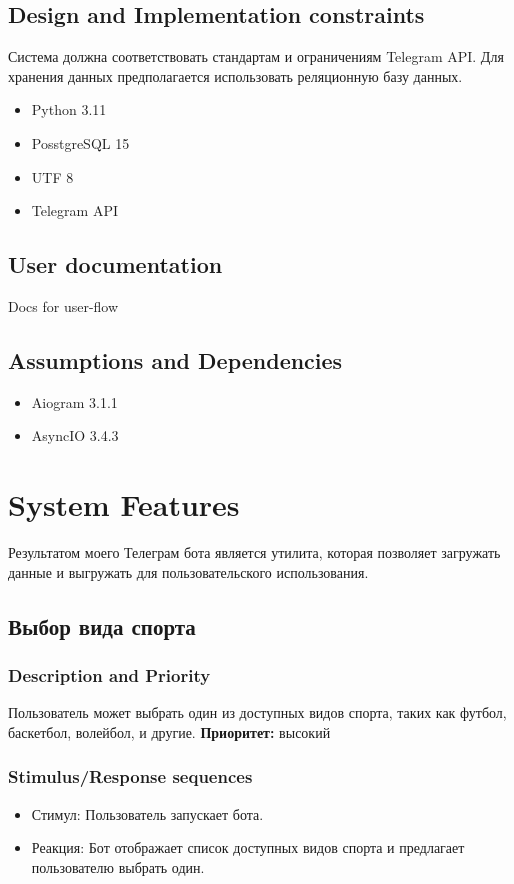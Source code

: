 \documentclass{scrreprt}
\begin{document}
\section{Design and Implementation constraints}
Система должна соответствовать стандартам и ограничениям Telegram API. Для хранения данных предполагается использовать реляционную базу данных.
\begin{itemize}
    \item Python 3.11
    \item PosstgreSQL 15
    \item UTF 8
    \item Telegram API
\end{itemize}


\section{User documentation}
Docs for user-flow

\section{Assumptions and Dependencies}
\begin{itemize}
    \item Aiogram 3.1.1
    \item AsyncIO 3.4.3
\end{itemize}

\chapter{System Features}
Результатом моего Телеграм бота является утилита, которая позволяет загружать данные и выгружать для пользовательского использования.

\section{Выбор вида спорта}

\subsection{Description and Priority}
Пользователь может выбрать один из доступных видов спорта, таких как футбол, баскетбол, волейбол, и другие.
\newline
\textbf{Приоритет:} высокий

\subsection{Stimulus/Response sequences}
\begin{itemize}
    \item Стимул: Пользователь запускает бота.
    \item Реакция: Бот отображает список доступных видов спорта и предлагает пользователю выбрать один.
\end{itemize}
\end{document}
